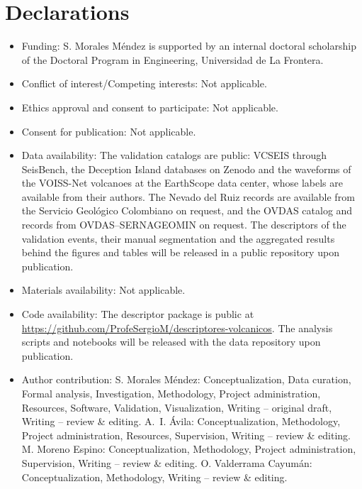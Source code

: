 \documentclass[pdflatex,sn-mathphys-num]{sn-jnl}
\begin{document}
\section*{Declarations}
\begin{itemize}
\item Funding: S. Morales M\'endez is supported by an internal doctoral
scholarship of the Doctoral Program in Engineering, Universidad de La
Frontera.
\item Conflict of interest/Competing interests: Not applicable.
\item Ethics approval and consent to participate: Not applicable.
\item Consent for publication: Not applicable.
\item Data availability: The validation catalogs are public: VCSEIS
\cite{zhong_deep-learning-based_2024} through SeisBench, the Deception Island
databases on Zenodo \cite{cortes_moreno_vsr_2018} and the waveforms of the
VOISS-Net volcanoes at the EarthScope data center, whose labels
\cite{fee_generalized_2025} are available from their authors. The Nevado del
Ruiz records are available from the Servicio Geol\'ogico Colombiano on
request, and the OVDAS catalog and records from OVDAS--SERNAGEOMIN on
request. The descriptors of the validation events, their manual
segmentation and the aggregated results behind the figures and tables will
be released in a public repository upon publication.
\item Materials availability: Not applicable.
\item Code availability: The descriptor package is public at
\url{https://github.com/ProfeSergioM/descriptores-volcanicos}. The analysis
scripts and notebooks will be released with the data repository upon
publication.
\item Author contribution: S. Morales M\'endez: Conceptualization, Data
curation, Formal analysis, Investigation, Methodology, Project
administration, Resources, Software, Validation, Visualization, Writing --
original draft, Writing -- review \& editing. A.~I. \'Avila:
Conceptualization, Methodology, Project administration, Resources,
Supervision, Writing -- review \& editing. M. Moreno Espino:
Conceptualization, Methodology, Project administration, Supervision,
Writing -- review \& editing. O. Valderrama Cayum\'an: Conceptualization,
Methodology, Writing -- review \& editing.
\end{itemize}
\end{document}
